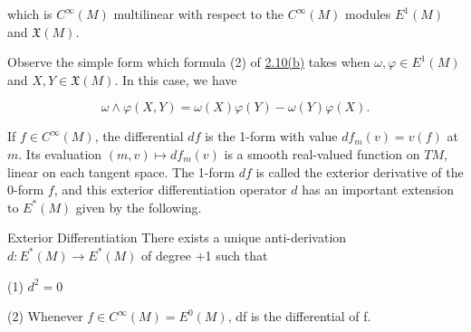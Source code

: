 which is $C^{\infty}(M)$ multilinear with respect to the $C^{\infty}(M)$ modules $E^{1}(M)$ and $\mathfrak{X}(M)$.

Observe the simple form which formula (2) of \hyperref[thm:2.10]{2.10(b)} takes when $\omega, \varphi \in E^1(M)$ and $X, Y \in \mathfrak{X}(M)$. In this case, we have 

\begin{equation}
\tag{8}\label{eq:2.18:8}
\omega\wedge\varphi(X,Y)=\omega(X)\varphi(Y)-\omega(Y)\varphi(X).
\end{equation}


\begin{definition}\label{thm:2.19}
If $f \in C^\infty(M)$, the differential $df$ is the 1-form with value $df_m(v)=v(f)$ at $m$. Its evaluation $(m,v)\mapsto df_m(v)$ is a smooth real-valued function on $TM$, linear on each tangent space. The 1-form $df$ is called the exterior derivative of the 0-form $f$, and this exterior differentiation operator $d$ has an important extension to $E^*(M)$ given by the following.

\end{definition}

\begin{theorem}{Exterior Differentiation}\label{thm:2.20}
There exists a unique anti-derivation $d\colon E^{*}(M)\to E^{*}(M)$ of degree +1 such that

(1)  $ d^{2}=0 $

(2) Whenever  $ f \in C^\infty(M) = E^0(M) $, df is the differential of f.

\end{theorem}


